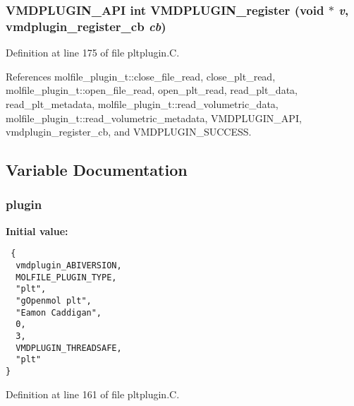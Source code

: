 \subsubsection{\setlength{\rightskip}{0pt plus 5cm}VMDPLUGIN\_\-API int VMDPLUGIN\_\-register (void $\ast$ {\em v}, {\bf vmdplugin\_\-register\_\-cb} {\em cb})}\label{pltplugin_8C_a7}




Definition at line 175 of file pltplugin.C.

References molfile\_\-plugin\_\-t::close\_\-file\_\-read, close\_\-plt\_\-read, molfile\_\-plugin\_\-t::open\_\-file\_\-read, open\_\-plt\_\-read, read\_\-plt\_\-data, read\_\-plt\_\-metadata, molfile\_\-plugin\_\-t::read\_\-volumetric\_\-data, molfile\_\-plugin\_\-t::read\_\-volumetric\_\-metadata, VMDPLUGIN\_\-API, vmdplugin\_\-register\_\-cb, and VMDPLUGIN\_\-SUCCESS.

\subsection{Variable Documentation}
\subsubsection{ plugin\hspace{0.3cm}{\tt  [static]}}\label{pltplugin_8C_a0}


{\bf Initial value:}

\footnotesize\begin{verbatim} {
  vmdplugin_ABIVERSION,   
  MOLFILE_PLUGIN_TYPE,    
  "plt",                  
  "gOpenmol plt",         
  "Eamon Caddigan",       
  0,                      
  3,                      
  VMDPLUGIN_THREADSAFE,   
  "plt"                   
}\end{verbatim}\normalsize 


Definition at line 161 of file pltplugin.C.